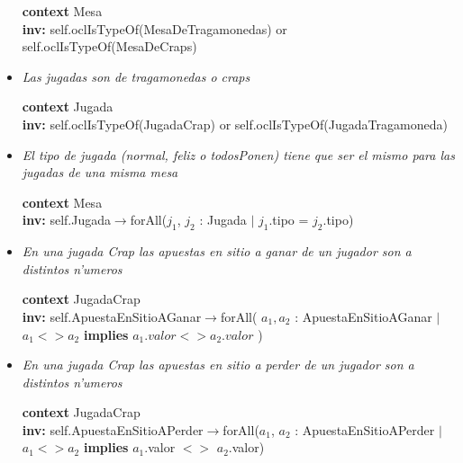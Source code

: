 \begin{itemize}
\textbf{context}  Mesa \\ \textbf{inv:} 
  self.oclIsTypeOf(MesaDeTragamonedas) or self.oclIsTypeOf(MesaDeCraps)


\item \textit{Las jugadas son de tragamonedas o craps}

\textbf{context}  Jugada \\ \textbf{inv:} 
  self.oclIsTypeOf(JugadaCrap) or self.oclIsTypeOf(JugadaTragamoneda)


\item\textit{ El tipo de jugada (normal, feliz o todosPonen) tiene que ser el mismo para las jugadas de una misma mesa}

\textbf{context}  Mesa \\ \textbf{inv:} 
  self.Jugada$\rightarrow$forAll($j_{1}$, $j_{2}$ : Jugada $|$ $j_{1}$.tipo = $j_{2}$.tipo)


\item\textit{ En una jugada Crap las apuestas en sitio a ganar de un jugador son a distintos n'umeros}

\textbf{context}  JugadaCrap \\ \textbf{inv:} 
  self.ApuestaEnSitioAGanar$\rightarrow$forAll( $a_{1}, a_{2}$ : ApuestaEnSitioAGanar $ | $ $ a_{1} <> a_{2} $  \textbf{implies} $ a_{1}.valor <> a_{2}.valor $ )


\item\textit{ En una jugada Crap las apuestas en sitio a perder de un jugador son a distintos n'umeros}

\textbf{context}  JugadaCrap \\ \textbf{inv:} 
  self.ApuestaEnSitioAPerder$\rightarrow$forAll($a_{1}$, $a_{2}$ : ApuestaEnSitioAPerder  $ | $ $a_{1} <> a_{2} $ \textbf{implies} $a_{1}$.valor $<>$ $a_{2}$.valor)

\end{itemize}
